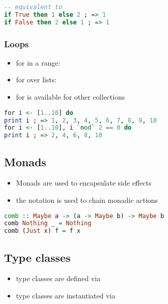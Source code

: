\documentclass[a4paper,landscape,10pt]{article}
\begin{document}
\begin{multicols*}{2}
\begin{lstlisting}[language=Haskell]
-- equivalent to
if True then 1 else 2 ; => 1
if False then 2 else 1 ; => 1
\end{lstlisting}

  \subsubsection{Loops}

  \begin{itemize}
    \item for in a range: 
    \item for over lists: 
    \item for is available for other collections
  \end{itemize}

  \begin{lstlisting}[language=Haskell]
for i <- [1..10] do
print i ; => 1, 2, 3, 4, 5, 6, 7, 8, 9, 10
for i <- [1..10], i `mod` 2 == 0 do
print i ; => 2, 4, 6, 8, 10
\end{lstlisting}

  \subsection{Monads}

  \begin{itemize}
    \item Monads are used to encapsulate side effects
    \item the  notation is used to chain monadic actions
  \end{itemize}

  \begin{lstlisting}[language=Haskell]
comb :: Maybe a -> (a -> Maybe b) -> Maybe b
comb Nothing _ = Nothing
comb (Just x) f = f x
\end{lstlisting}

  \subsection{Type classes}

  \begin{itemize}
    \item type classes are defined via 
    \item type classes are instantiated via 
  \end{itemize}


\end{multicols*}
\end{document}
